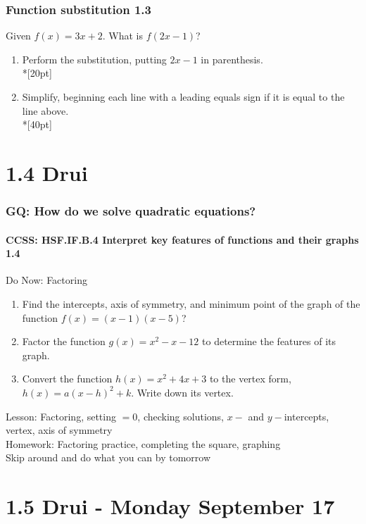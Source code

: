 \documentclass{beamer}
\begin{document}
\frame
{
  \frametitle{Function substitution  \alert{1.3}}
  Given $f(x)=3x+2$. What is $f(2x-1)$? \bigskip
    \begin{enumerate}
        \item Perform the substitution, putting $2x-1$ in parenthesis.\\*[20pt]
        \item Simplify, beginning each line with a leading equals sign if it is equal to the line above.\\*[40pt]
  \end{enumerate}
  }

  \section{1.4 Drui}
  \frame
  {
    \frametitle{GQ: How do we solve quadratic equations?}
    \framesubtitle{CCSS: HSF.IF.B.4 Interpret key features of functions and their graphs  \alert{1.4}}

    \begin{block}{Do Now: Factoring}
    \begin{enumerate}
      \item Find the intercepts, axis of symmetry, and minimum point of the graph of the function $f(x)=(x-1)(x-5)$?
      \item Factor the function $g(x)=x^2-x-12$ to determine the features of its graph.
      \item Convert the function $h(x)=x^2+4x+3$ to the vertex form, $h(x)=a(x-h)^2+k$. Write down its vertex.
    \end{enumerate}
    \end{block}
    Lesson: Factoring, setting $=0$, checking solutions, $x-$ and $y-$intercepts, vertex, axis of symmetry
    \\ \bigskip
    Homework: Factoring practice, completing the square, graphing\\
    Skip around and do what you can by tomorrow
  }

  \section{1.5 Drui - Monday September 17}
\end{document}
